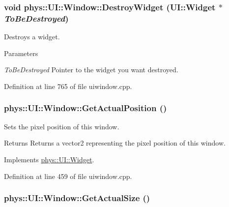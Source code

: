 \hypertarget{classphys_1_1UI_1_1Window_ab4bda54a82b64aec2cf4e03201a40772}{
\subsubsection[{DestroyWidget}]{\setlength{\rightskip}{0pt plus 5cm}void phys::UI::Window::DestroyWidget ({\bf UI::Widget} $\ast$ {\em ToBeDestroyed})}}
\label{d4/d86/classphys_1_1UI_1_1Window_ab4bda54a82b64aec2cf4e03201a40772}


Destroys a widget. 


\begin{DoxyParams}{Parameters}
\item[{\em ToBeDestroyed}]Pointer to the widget you want destroyed. \end{DoxyParams}


Definition at line 765 of file uiwindow.cpp.

\hypertarget{classphys_1_1UI_1_1Window_a811fb495bc698752e03778b18f2b1a30}{
\subsubsection[{GetActualPosition}]{ phys::UI::Window::GetActualPosition ()}}
\label{d4/d86/classphys_1_1UI_1_1Window_a811fb495bc698752e03778b18f2b1a30}


Sets the pixel position of this window. 

\begin{DoxyReturn}{Returns}
Returns a vector2 representing the pixel position of this window. 
\end{DoxyReturn}


Implements \hyperlink{classphys_1_1UI_1_1Widget_a0a29fecff7f56d7909f65fd63b0990e7}{phys::UI::Widget}.



Definition at line 459 of file uiwindow.cpp.

\hypertarget{classphys_1_1UI_1_1Window_a22f5ca800e44c5e2cfeed59c243b03ed}{
\subsubsection[{GetActualSize}]{ phys::UI::Window::GetActualSize ()}}
\label{d4/d86/classphys_1_1UI_1_1Window_a22f5ca800e44c5e2cfeed59c243b03ed}


